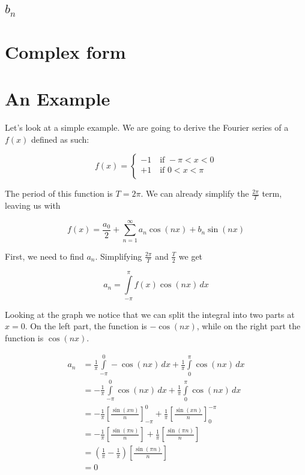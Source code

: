 \documentclass{article}
\newcommand{\integral}[4]{\int\limits_{#1}^{#2} #3\,d#4}
\begin{document}
\subsection{\(b_n\)}

\section{Complex form}

\pagebreak

\section{An Example}

Let's look at a simple example. We are going to derive the Fourier series of a \(f(x)\) defined as such:

\[
    f(x)=
    \begin{cases}
        -1\quad \text{if } -\pi < x < 0 \\
        +1\quad \text{if } 0 < x < \pi \\
    \end{cases}
\]

The period of this function is \(T=2\pi\). We can already simplify the \(\frac{2\pi}{T}\) term, leaving us with

\[
    f(x)=\frac{a_0}{2} + \sum_{n=1}^{\infty} a_n \cos(nx) + b_n \sin(nx)
\]

First, we need to find \(a_n\). Simplifying \(\frac{2\pi}{T}\) and \(\frac{T}{2}\) we get

\[
    a_n=\integral{-\pi}{\pi}{f(x)\cos(nx)}{x}
\]

Looking at the graph we notice that we can split the integral into two parts at \(x=0\).
On the left part, the function is \(-\cos(nx)\), while on the right part the function is \(\cos(nx)\).

\begin{align*}
    a_n &=
    \frac{1}{\pi} \integral{-\pi}{0}{-\cos(nx)}{x} +
    \frac{1}{\pi} \integral{0}{\pi}{\cos(nx)}{x} \\
    &= -\frac{1}{\pi} \integral{-\pi}{0}{\cos(nx)}{x} +
    \frac{1}{\pi} \integral{0}{\pi}{\cos(nx)}{x} \\
    &= -\frac{1}{\pi} {\left[\frac{\sin(xn)}{n}\right]}_{-\pi}^{0} +
    \frac{1}{\pi} {\left[\frac{\sin(xn)}{n}\right]}_{0}^{-\pi} \\
    &= -\frac{1}{\pi} \left[\frac{\sin(\pi n)}{n}\right] +
    \frac{1}{\pi} \left[\frac{\sin(\pi n)}{n}\right] \\
    &= \left(\frac{1}{\pi}-\frac{1}{\pi}\right) \left[\frac{\sin(\pi n)}{n}\right] \\
    &= 0
\end{align*}
\end{document}
